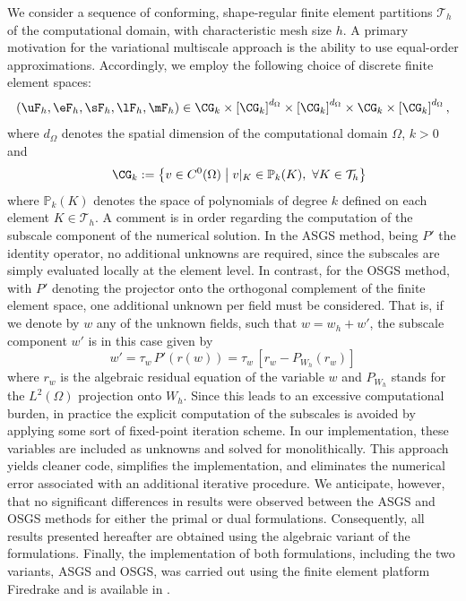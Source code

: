 We consider a sequence of conforming, shape-regular finite element partitions $\mathcal{T}_h$ of the computational domain, with characteristic mesh size $h$. A primary motivation for the variational multiscale approach is the ability to use equal-order approximations. Accordingly, we employ the following choice of discrete finite element spaces:
\begin{equation*}\label{eq:equal_order_func_spaces}
	\left(\uF_{h}, \eF_{h}, \sF_{h}, \lF_{h}, \mF_{h}\right)
	\in
	\CG_{k} \times \left[\CG_{k}\right]^{d_{\Omega}}
	\times \left[\CG_{k}\right]^{d_{\Omega}}
	\times \CG_{k}
	\times \left[\CG_{k}\right]^{d_{\Omega}},
\end{equation*}
where $d_{\Omega}$ denotes the spatial dimension of the computational domain $\Omega$, $k>0$ and 
\begin{equation*}
	\quad \CG_{k} := \left\{ v \in C^0(\Omega) \;\middle|\; v|_K \in \mathbb{P}_k(K),\ \forall K \in \mathcal{T}_h \right\}	
\end{equation*}
where $\mathbb{P}_k(K)$ denotes the space of polynomials of degree $k$ defined on each element $K \in \mathcal{T}_h$.
A comment is in order regarding the computation of the subscale component of the numerical
solution. In the ASGS method, being $P'$ the identity operator, no additional unknowns are
required, since the subscales are simply evaluated locally at the element level. In contrast, 
for the OSGS method, with $P'$ denoting the projector onto the orthogonal complement of the 
finite element space, one additional unknown per field must be considered.
That is, if we denote by $w$ any of the unknown fields, such that $w = w_h + w'$, 
the subscale component $w'$ is in this case given by
\begin{equation}
w' = \tau_w \, P' \left ( r(w) \right ) = \tau_w \, \left [ r_w - P_{W_{h}} \left ( r_w \right ) \right ]
\end{equation}
where $r_w$ is the algebraic residual equation of the variable $w$ and $P_{W_{h}}$ stands for the $L^2(\Omega)$ projection onto $W_h$.
Since this leads to an excessive computational burden, in practice the explicit computation 
of the subscales is avoided by applying some sort of fixed-point iteration scheme. 
In our implementation, these variables are included as unknowns and solved for 
monolithically. This approach yields cleaner code, simplifies the implementation, 
and eliminates the numerical error associated with an additional iterative procedure. 
We anticipate, however, that no significant differences in results were observed between the 
ASGS and OSGS methods for either the primal or dual formulations. 
Consequently, all results presented hereafter are obtained using the algebraic variant 
of the formulations. Finally, the implementation of both formulations, including the two variants,
ASGS and OSGS, was carried out using the finite element platform Firedrake \cite{firedrake} and is available in \cite{githubrepoddcm}.

